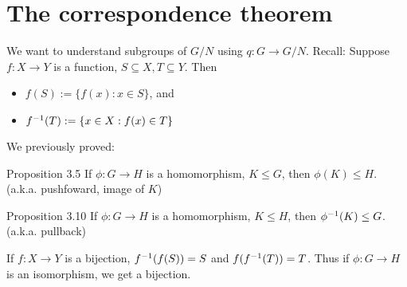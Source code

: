 \section{The correspondence theorem}
We want to understand subgroups of $G/N$ using $q:G\to G/N$. Recall: Suppose $f:X\to Y$ is a function, $S\subseteq X, T\subseteq Y$. Then 
\begin{itemize}
	\item $f(S):= \{f(x):x\in S\}$, and 
	\item $f^{-1} (T):=\{x\in X: f(x)\in T\}$
\end{itemize}
We previously proved:
\begin{law}{Proposition 3.5}
If $\phi:G\to H$ is a homomorphism, $K\le G$, then $\phi(K)\le H$. (a.k.a. pushfoward, image of $K$)
\end{law}

\begin{law}{Proposition 3.10}
	If $\phi:G\to H$ is a homomorphism, $K\le H$, then $\phi^{-1}(K)\le G$. (a.k.a. pullback)
\end{law}

If $f:X\to Y$ is a bijection, $f^{-1}(f(S))=S$ and $f(f^{-1} (T))=T$. Thus if $\phi:G\to H$ is an isomorphism, we get a bijection.

